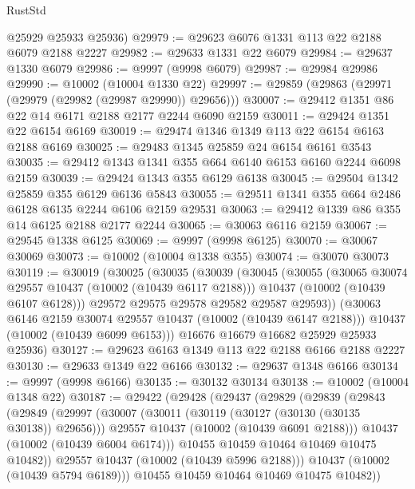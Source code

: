 \begin{lexlean}{RustStd}
\begin{coremodule}
      @25929
      @25933
      @25936)
@29979 := @29623 @6076 @1331 @113 @22 @2188 @6079 @2188 @2227
@29982 := @29633 @1331 @22 @6079
@29984 := @29637 @1330 @6079
@29986 := @9997 (@9998 @6079)
@29987 := @29984 @29986
@29990 := @10002 (@10004 @1330 @22)
@29997 := @29859 (@29863 (@29971 (@29979 (@29982 (@29987 @29990)) @29656)))
@30007 := @29412 @1351 @86 @22 @14 @6171 @2188 @2177 @2244 @6090 @2159
@30011 := @29424 @1351 @22 @6154 @6169
@30019 := @29474 @1346 @1349 @113 @22 @6154 @6163 @2188 @6169
@30025 := @29483 @1345 @25859 @24 @6154 @6161 @3543
@30035 := @29412 @1343 @1341 @355 @664 @6140 @6153 @6160 @2244 @6098 @2159
@30039 := @29424 @1343 @355 @6129 @6138
@30045 := @29504 @1342 @25859 @355 @6129 @6136 @5843
@30055 := @29511 @1341 @355 @664 @2486 @6128 @6135 @2244 @6106 @2159 @29531
@30063 := @29412 @1339 @86 @355 @14 @6125 @2188 @2177 @2244
@30065 := @30063 @6116 @2159
@30067 := @29545 @1338 @6125
@30069 := @9997 (@9998 @6125)
@30070 := @30067 @30069
@30073 := @10002 (@10004 @1338 @355)
@30074 := @30070 @30073
@30119 := @30019
    (@30025
      (@30035
        (@30039
          (@30045
            (@30055
              (@30065 @30074 @29557 @10437 (@10002 (@10439 @6117 @2188)))
              @10437
              (@10002 (@10439 @6107 @6128)))
            @29572
            @29575
            @29578
            @29582
            @29587
            @29593))
        (@30063 @6146 @2159 @30074 @29557 @10437 (@10002 (@10439 @6147 @2188)))
        @10437
        (@10002 (@10439 @6099 @6153)))
      @16676
      @16679
      @16682
      @25929
      @25933
      @25936)
@30127 := @29623 @6163 @1349 @113 @22 @2188 @6166 @2188 @2227
@30130 := @29633 @1349 @22 @6166
@30132 := @29637 @1348 @6166
@30134 := @9997 (@9998 @6166)
@30135 := @30132 @30134
@30138 := @10002 (@10004 @1348 @22)
@30187 := @29422
    (@29428
      (@29437
        (@29829
          (@29839
            (@29843
              (@29849
                (@29997
                  (@30007
                    (@30011 (@30119 (@30127 (@30130 (@30135 @30138)) @29656)))
                    @29557
                    @10437
                    (@10002 (@10439 @6091 @2188)))
                  @10437
                  (@10002 (@10439 @6004 @6174)))
                @10455
                @10459
                @10464
                @10469
                @10475
                @10482))
            @29557
            @10437
            (@10002 (@10439 @5996 @2188)))
          @10437
          (@10002 (@10439 @5794 @6189)))
        @10455
        @10459
        @10464
        @10469
        @10475
        @10482))

\end{coremodule}
\end{lexlean}

